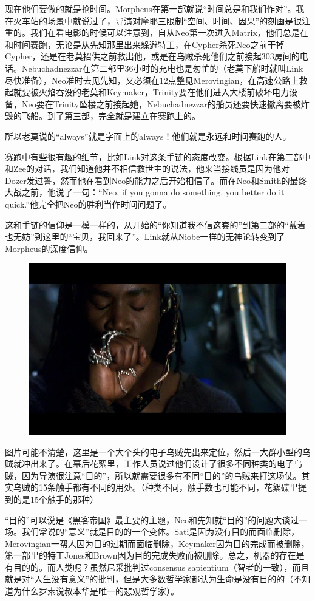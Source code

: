 \documentclass[UTF8]{ctexart}
\begin{document}
现在他们要做的就是抢时间。Morpheus在第一部就说“时间总是和我们作对”。我在火车站的场景中就说过了，导演对摩耶三限制“空间、时间、因果”的刻画是很注重的。我们在看电影的时候可以注意到，自从Neo第一次进入Matrix，他们总是在和时间赛跑，无论是从先知那里出来躲避特工，在Cypher杀死Neo之前干掉Cypher，还是在老莫招供之前救出他，或是在乌贼杀死他们之前接起303房间的电话。Nebuchadnezzar在第二部里36小时的充电也是匆忙的（老莫下船时就叫Link尽快准备），Neo准时去见先知，又必须在12点整见Merovingian，在高速公路上救起就要被火焰吞没的老莫和Keymaker，Trinity要在他们进入大楼前破坏电力设备，Neo要在Trinity坠楼之前接起她，Nebuchadnezzar的船员还要快速撤离要被炸毁的飞船。到了第三部，完全就是建立在赛跑上的。

所以老莫说的“always”就是字面上的always！他们就是永远和时间赛跑的人。

赛跑中有些很有趣的细节，比如Link对这条手链的态度改变。根据Link在第二部中和Zee的对话，我们知道他并不相信救世主的说法，他来当接线员是因为他对Dozer发过誓，然而他在看到Neo的能力之后开始相信了。而在Neo和Smith的最终大战之前，他说了一句：“Neo, if you gonna do something, you better do it quick.”他完全把Neo的胜利当作时间问题了。

这和手链的信仰是一模一样的，从开始的“你知道我不信这套的”到第二部的“戴着也无妨”到这里的“宝贝，我回来了”。Link就从Niobe一样的无神论转变到了Morpheus的深度信仰。

\begin{figure}[htb]
\centering
\includegraphics[width=0.5\linewidth]{fig/aea59e3d72117d00bba16754.jpg}
\end{figure}

图片可能不清楚，这里是一个大个头的电子乌贼先出来定位，然后一大群小型的乌贼就冲出来了。在幕后花絮里，工作人员说过他们设计了很多不同种类的电子乌贼，因为导演很注意“目的”，所以就需要很多有不同“目的”的乌贼来打这场仗。其实乌贼的15条触手都有不同的用处。（种类不同，触手数也可能不同，花絮碟里提到的是15个触手的那种）

“目的”可以说是《黑客帝国》最主要的主题，Neo和先知就“目的”的问题大谈过一场。我们常说的“意义”就是目的的一个变体。Sati是因为没有目的而面临删除，Merovingian一帮人因为目的过期而面临删除，Keymaker因为目的完成而被删除，第一部里的特工Jones和Brown因为目的完成失败而被删除。总之，机器的存在是有目的的。而人类呢？虽然尼采批判过consensus sapientium（智者的一致），而且就是对“人生没有意义”的批判，但是大多数哲学家都认为生命是没有目的的（不知道为什么罗素说叔本华是唯一的悲观哲学家）。
\end{document}
